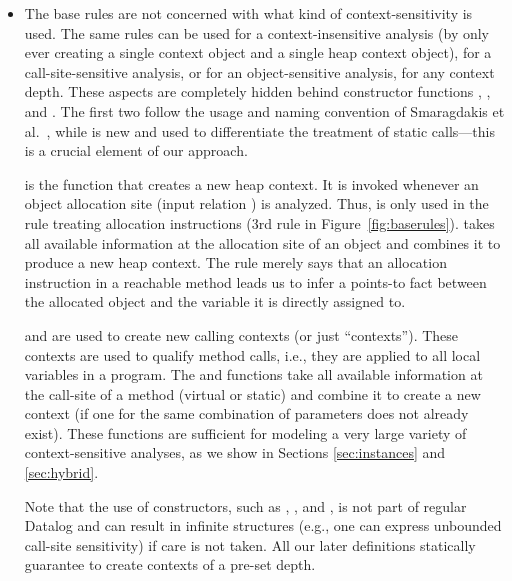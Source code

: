 \begin{itemize}
\item The base rules are not concerned with what kind of
  context-sensitivity is used. The same rules can be used for a
  context-insensitive analysis (by only ever creating a single context
  object and a single heap context object), for a call-site-sensitive
  analysis, or for an object-sensitive analysis, for any context
  depth. These aspects are completely hidden behind constructor
  functions , , and
  . The first two follow the usage and naming
  convention of Smaragdakis et al.~\cite{popl:2011:Smaragdakis}, while
   is new and used to differentiate the
  treatment of static calls---this is a crucial element of our approach.

   is the function that creates a new heap context.
  It is invoked whenever an object allocation site (input relation
  ) is analyzed. Thus,  is only used
  in the rule treating allocation instructions (3rd rule in
  Figure~\ref{fig:baserules}).  takes all available
  information at the allocation site of an object and combines it to
  produce a new heap context. The rule merely says that an allocation
  instruction in a reachable method leads us to infer a points-to
  fact between the allocated object and the variable it is directly
  assigned to.

   and  are used to create new
  calling contexts (or just ``contexts''). These contexts are used to
  qualify method calls, i.e., they are applied to all local variables
  in a program. The  and 
  functions take all available information at the call-site of a
  method (virtual or static) and combine it to create a new context
  (if one for the same combination of parameters does not already
  exist). These functions are sufficient for modeling a very large
  variety of context-sensitive analyses, as we show in Sections
  \ref{sec:instances} and \ref{sec:hybrid}.

  Note that the use of constructors, such as ,
  , and , is not part of regular
  Datalog and can result in infinite structures (e.g., one can express
  unbounded call-site sensitivity) if care is not taken. All our later
  definitions statically guarantee to create contexts of a pre-set
  depth.


\end{itemize}
